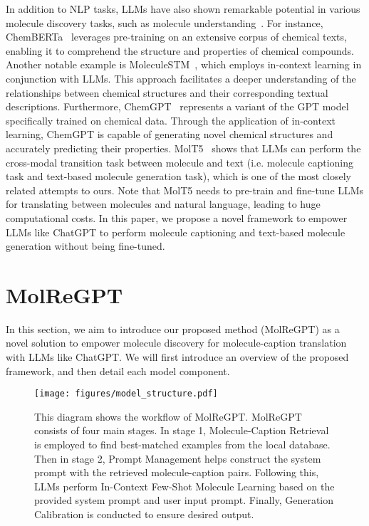 \documentclass{article}
\theoremstyle{plain}
\theoremstyle{definition}
\theoremstyle{remark}
\begin{document}
In addition to NLP tasks, LLMs have also shown remarkable potential in various molecule discovery tasks, such as molecule understanding~\cite{bran2023chemcrow,white2023future}. For instance, ChemBERTa~\cite{chithrananda2020chemberta} leverages pre-training on an extensive corpus of chemical texts, enabling it to comprehend the structure and properties of chemical compounds. Another notable example is MoleculeSTM~\cite{liu2022multi}, which employs in-context learning in conjunction with LLMs. This approach facilitates a deeper understanding of the relationships between chemical structures and their corresponding textual descriptions. 
Furthermore, ChemGPT~\cite{frey2022neural} represents a variant of the GPT model specifically trained on chemical data. Through the application of in-context learning, ChemGPT is capable of generating novel chemical structures and accurately predicting their properties.
MolT5~\cite{edwards-etal-2022-translation} shows that LLMs can perform the cross-modal transition task between molecule and text (i.e. molecule captioning task and text-based molecule generation task), which is one of the most closely related attempts to ours. 
Note that MolT5 needs to pre-train and fine-tune LLMs for translating between molecules and natural language, leading to huge computational costs. In this paper, we propose a novel framework to empower LLMs like ChatGPT to perform molecule captioning and text-based molecule generation without being fine-tuned.  \section{MolReGPT}
\label{sec:methodlogy}

In this section, we aim to introduce our proposed method (MolReGPT) as a novel solution to empower molecule discovery for molecule-caption translation with LLMs like ChatGPT.
We will first introduce an overview of the proposed framework, and then detail each model component.

\begin{figure*}[htb]
    \centering
    \texttt{[image: figures/model\_structure.pdf]}
    \caption{This diagram shows the workflow of MolReGPT. MolReGPT consists of four main stages. 
    In stage 1, Molecule-Caption Retrieval is employed to find  best-matched examples from the local database. 
    Then in stage 2, Prompt Management helps construct the system prompt with the retrieved molecule-caption pairs. Following this, LLMs perform In-Context Few-Shot Molecule Learning based on the provided system prompt and user input prompt. 
    Finally, Generation Calibration is conducted to ensure desired output.}
    \label{fig:prompt}
\end{figure*}
\end{document}
